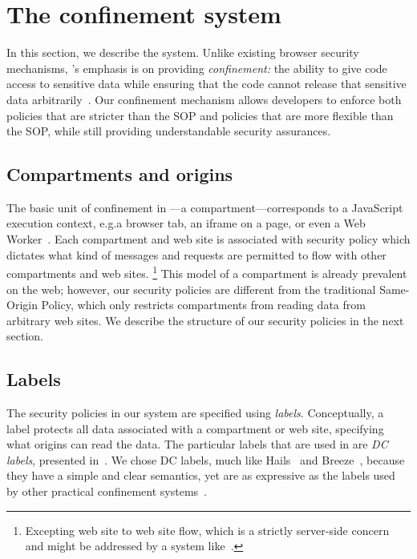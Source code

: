 \section{The \sys{} confinement system}
\label{sec:system}

In this section, we describe the \sys{} system.
%
Unlike existing browser security mechanisms, \sys{}'s emphasis
is on providing \emph{confinement:} the ability to give code access to sensitive
data while ensuring that the code cannot release that sensitive
data arbitrarily~\cite{SaltzerS75}.
%
Our confinement mechanism allows developers to enforce both policies
that are stricter than the SOP and policies that are more flexible
than the SOP, while still providing understandable security assurances.

\subsection{Compartments and origins}

The basic unit of confinement in \sys{}---a compartment---corresponds to
a JavaScript execution context, e.g.\@ a browser tab, an iframe on a
page, or even a Web Worker~\cite{workers}.
%
Each compartment and web site is associated with security policy which
dictates what kind of messages and requests are permitted to flow with
other compartments and web sites.%
%
\footnote{
    Excepting web site to web site flow, which is a strictly server-side
    concern and might be addressed by a system
    like~\cite{giffin:2012:hails}.
}
%
This model of a compartment is already prevalent on the web; however,
our security policies are different from the traditional Same-Origin
Policy, which only restricts compartments from reading data from
arbitrary web sites.
%
We describe the structure of our security policies in the next section.

\subsection{Labels}

The security policies in our system are specified using \emph{labels}.
%
Conceptually, a label protects all data associated with a compartment or
web site, specifying what origins can read the data.
%
The particular labels that are used in \sys{} are \emph{DC labels},
presented in~\cite{stefan:2011:dclabels}.
%
We chose DC labels, much like Hails~\cite{giffin:2012:hails} and
Breeze~\cite{Breeze13}, because they have a simple and clear
semantics, yet are as expressive as the labels used by other practical
confinement systems~\cite{GenLabels}.

